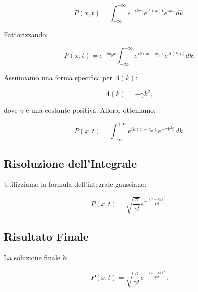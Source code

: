 \documentclass{article}
\begin{document}
\[
P(x, t) = \int_{-\infty}^{+\infty} e^{-ikx_0} e^{\Lambda(k) t} e^{ikx} \, dk.
\]

Fattorizzando:

\[
P(x, t) = e^{-ix_0 k} \int_{-\infty}^{+\infty} e^{ik(x - x_0)} e^{\Lambda(k) t} \, dk.
\]

Assumiamo una forma specifica per \( \Lambda(k) \):

\[
\Lambda(k) = -\gamma k^2,
\]

dove \( \gamma \) è una costante positiva. Allora, otteniamo:

\[
P(x, t) = \int_{-\infty}^{+\infty} e^{ik(x - x_0)} e^{-\gamma k^2 t} \, dk.
\]

\subsection*{Risoluzione dell'Integrale}

Utilizziamo la formula dell'integrale gaussiano:

\[
P(x, t) = \sqrt{\frac{\pi}{\gamma t}} e^{-\frac{(x - x_0)^2}{4\gamma t}}.
\]

\subsection*{Risultato Finale}

La soluzione finale è:

\[
P(x, t) = \sqrt{\frac{\pi}{\gamma t}} e^{-\frac{(x - x_0)^2}{4\gamma t}}.
\]
\end{document}
